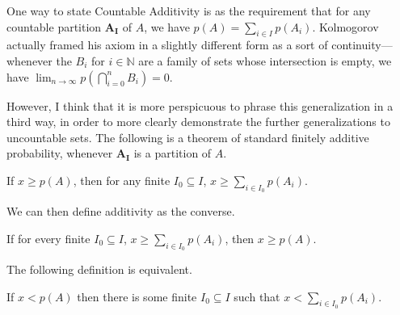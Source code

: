 One way to state Countable Additivity is as the requirement that for any countable partition $\mathbf{A_I}$  of $A$, we have $p(A)=\sum_{i\in I}p(A_i)$. Kolmogorov actually framed his axiom in a slightly different form as a sort of continuity---whenever the $B_i$ for $i\in\mathbb{N}$ are a family of sets whose intersection is empty, we have $\lim_{n\to\infty}p(\bigcap_{i=0}^{n}B_i)=0$.

However, I think that it is more perspicuous to phrase this generalization in a third way, in order to more clearly demonstrate the further generalizations to uncountable sets. The following is a theorem of standard finitely additive probability, whenever $\mathbf{A_I}$ is a partition of $A$.
\begin{theorem}\label{superadd} If $x\geq p(A)$, then for any finite $I_0\subseteq I$, $x\geq\sum_{i\in I_0}p(A_i)$.\end{theorem}
We can then define additivity as the converse.
\begin{definition} If for every finite $I_0\subseteq I$, $x\geq\sum_{i\in I_0}p(A_i)$, then $x\geq p(A)$.\end{definition}
The following definition is equivalent.
\begin{definition}\label{finitesub} If $x<p(A)$ then there is some finite $I_0\subseteq I$ such that $x<\sum_{i\in I_0}p(A_i)$.\end{definition}


